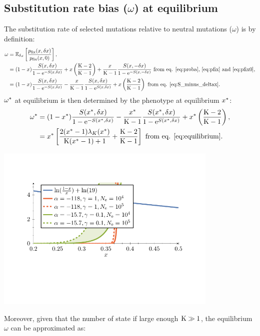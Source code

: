 \documentclass{article}
\renewcommand*{\bm}[1]{#1}%
\begin{document}
\subsection{Substitution rate bias ($\bm{\omega}$) at equilibrium}
The substitution rate of selected mutations relative to neutral mutations ($\omega$) is by definition:
\begin{align}
\omega & = \operatorname{\mathbb{E}}_{\delta x} \left[ \frac{p_{\text{fix}}(x, \delta x)}{p_{\text{fix}}(x, 0)} \right], \\
 & = (1 - x) \frac{ S(x, \delta x)}{1 - \mathrm{e}^{-S(x, \delta x)}} + x \left(\frac{\text{K} - 2}{\text{K} - 1}\right) + \frac{x}{\text{K}-1} \frac{ S(x, -\delta x)}{1 - \mathrm{e}^{-S(x, -\delta x)}} \text{ from eq. \ref{eq:proba}, \ref{eq:pfix} and \ref{eq:pfix0}}, \\
 & = (1 - x) \frac{ S(x, \delta x)}{1 - \mathrm{e}^{-S(x, \delta x)}} - \frac{x}{\text{K}-1}  \frac{ S(x, \delta x)}{1 - \mathrm{e}^{S(x, \delta x)}} +  x \left(\frac{\text{K} - 2}{\text{K} - 1}\right) \text{ from eq. \ref{eq:S_minus_deltax}}.
\end{align}
$\omega^{*}$ at equilibrium is then determined by the phenotype at equilibrium $x^{*}$:
\begin{align}
\omega^{*} &= (1 - x^{*}) \frac{ S(x^{*}, \delta x)}{1 - \mathrm{e}^{-S(x^{*}, \delta x)}} - \frac{x^{*}}{\text{K}-1} \frac{ S(x^{*}, \delta x)}{1 - \mathrm{e}^{S(x^{*}, \delta x)}} + x^{*} \left(\frac{\text{K} - 2}{\text{K} - 1}\right) , \\
 &= x^{*} \left[ \frac{2 (x^{*}-1)  \lambda_{K}(x^{*}) }{\text{K} (x^{*}-1)+1} + \frac{\text{K} - 2}{\text{K} - 1}\right] \text{ from eq. \ref{eq:equilibrium}}.
\end{align}
\begin{center}
 \includegraphics[width=0.8\textwidth, page=2] {figures.pdf}
\end{center}
Moreover, given that the number of state if large enough $\text{K} \gg 1$, the equilibrium $\omega$ can be approximated as:
\end{document}
